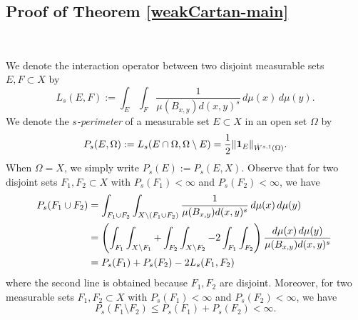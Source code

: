 \documentclass[11pt,leqno]{amsart}
\numberwithin{equation}{section}
\theoremstyle{definition}
\begin{document}
	\subsection{Proof of Theorem \ref{weakCartan-main}}\
	
	
	
	
	We denote the interaction operator between two disjoint measurable sets $E,F\subset X$ by
	\[
	L_s(E,F):=\int_E\int_F  \frac{1}{\mu(B_{x,y})d(x,y)^s}\,d\mu(x)\,d\mu(y).
	\]
	We denote the \emph{$s$-perimeter} of a measurable set $E\subset X$ in an open set $\Omega$ by $$P_{s}(E,\Omega):=L_{s}(E\cap\Omega, \Omega\setminus E)=\frac{1}{2}\|{\bf  1}_E \|_{\dot W^{s,1}(\Omega)}.$$
	When $\Omega=X$, we simply write $P_s(E):=P_s(E,X)$.
	Observe that for two disjoint sets $F_1,F_2\subset X$ with $P_s(F_1)<\infty$ and $P_s(F_2)<\infty$, we have
	\begin{align} 
		\notag		P_s(F_1\cup F_2) & = \int_{F_1\cup F_2}\int_{X\setminus (F_1\cup F_2)}  \frac{1}{\mu(B_{x,y})d(x,y)^s}\,d\mu(x)\,d\mu(y)\\
		\notag & =  \left(\int_{F_1}\int_{X\setminus F_1} +  \int_{F_2}\int_{X\setminus F_2} - 2 \int_{F_1}\int_{F_2} \right) \frac{d\mu(x)\,d\mu(y)}{\mu(B_{x,y})d(x,y)^s}\, \\
		& =P_s(F_1)+P_s(F_2)  -2L_s(F_1,F_2)
		\label{eq:F1 and F2}
	\end{align}
	where the second line is obtained because $F_1, F_2$ are disjoint.
	Moreover, for two measurable sets $F_1, F_2\subset X$ with $P_s(F_1)<\infty$ and $P_s(F_2)<\infty$, we have
	\begin{equation}
		\label{eq3.25-dec}P_s(F_1\setminus F_2)\leq P_s(F_1)+P_s(F_2) <\infty.
	\end{equation}
	
\end{document}
